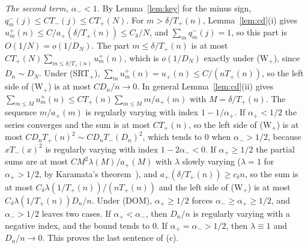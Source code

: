 \emph{The second term, $\alpha_\minus<1$.} By Lemma~\ref{lem:key} for the minus sign,
$q^\minus_m(j)\le CT_\minus(j)\le CT_\plus(N)$. For $m>\delta/T_\plus(n)$, Lemma~\ref{lem:cd}(i) gives
$u^\plus_m(n)\le C/a_\plus(\delta/T_\plus(n))\le C_\delta/N$, and $\sum_mq^\minus_m(j)=1$, so this part
is $O(1/N)=o(1/D_N)$. The part $m\le\delta/T_\plus(n)$ is at most
$CT_\plus(N)\sum_{m\le\delta/T_\plus(n)}u^\plus_m(n)$, which is $o(1/D_N)$ exactly under (W$_\plus$),
since $D_n\sim D_N$. Under (SRT$_\plus$), $\sum_mu^\plus_m(n)=u_\plus(n)\le C/(nT_\plus(n))$, so the
left side of (W$_\plus$) is at most $CD_n/n\to0$. In general Lemma~\ref{lem:cd}(ii) gives
$\sum_{m\le M}u^\plus_m(n)\le CT_\plus(n)\sum_{m\le M}m/a_\plus(m)$ with $M=\delta/T_\plus(n)$. The
sequence $m/a_\plus(m)$ is regularly varying with index $1-1/\alpha_\plus$. If $\alpha_\plus<1/2$ the
series converges and the sum is at most $CT_\plus(n)$, so the left side of (W$_\plus$) is at most
$CD_nT_\plus(n)^2\sim CD_nT_\minus(D_n)^2$, which tends to $0$ when $\alpha_\minus>1/2$, because
$xT_\minus(x)^2$ is regularly varying with index $1-2\alpha_\minus<0$. If $\alpha_\plus\ge1/2$ the partial
sums are at most $CM^2\lambda(M)/a_\plus(M)$ with $\lambda$ slowly varying ($\lambda=1$ for
$\alpha_\plus>1/2$, by Karamata's theorem~\cite[Proposition~1.5.8 and~1.5.9a]{bgt1989}), and
$a_\plus(\delta/T_\plus(n))\ge c_\delta n$, so the sum is at most $C_\delta\lambda(1/T_\plus(n))/(nT_\plus(n))$
and the left side of (W$_\plus$) is at most $C_\delta\lambda(1/T_\plus(n))D_n/n$. Under (DOM),
$\alpha_\plus\ge1/2$ forces $\alpha_\minus\ge\alpha_\plus\ge1/2$, and $\alpha_\minus>1/2$ leaves two cases.
If $\alpha_\plus<\alpha_\minus$, then $D_n/n$ is regularly varying with a negative index, and the
bound tends to $0$. If $\alpha_\plus=\alpha_\minus>1/2$, then $\lambda\equiv1$ and $D_n/n\to0$. This proves
the last sentence of (c).

